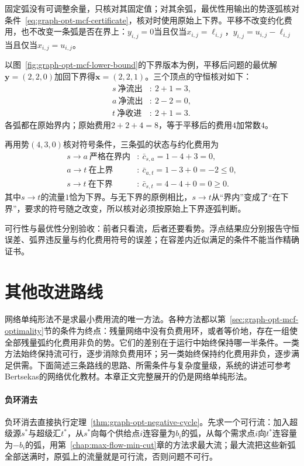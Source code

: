 固定弧没有可调整余量，只核对其固定值；对其余弧，最优性用输出的势逐弧核对条件~\eqref{eq:graph-opt-mcf-certificate}，核对时使用原始上下界。平移不改变约化费用，也不改变一条弧是否在界上：$y_{i,j}=0$当且仅当$x_{i,j}=\ell_{i,j}$，$y_{i,j}=u_{i,j}-\ell_{i,j}$当且仅当$x_{i,j}=u_{i,j}$。

以图~\ref{fig:graph-opt-mcf-lower-bound}的下界版本为例，平移后问题的最优解$\bm y=(2,2,0)$加回下界得$\bm x=(2,2,1)$。三个顶点的守恒核对如下：
\[
  \begin{aligned}
    s\ \text{净流出}&:\ 2+1=3,\\
    a\ \text{净流出}&:\ 2-2=0,\\
    t\ \text{净收进}&:\ 2+1=3.
  \end{aligned}
\]
各弧都在原始界内；原始费用$2+2+4=8$，等于平移后的费用$4$加常数$4$。

再用势$(4,3,0)$核对符号条件，三条弧的状态与约化费用为
\[
  \begin{aligned}
    s\to a\ \text{严格在界内}&:\ \bar c_{s,a}=1-4+3=0,\\
    a\to t\ \text{在上界}&:\ \bar c_{a,t}=1-3+0=-2\leq0,\\
    s\to t\ \text{在下界}&:\ \bar c_{s,t}=4-4+0=0\geq0.
  \end{aligned}
\]
其中$s\to t$的流量$1$恰为下界。与无下界的原例相比，$s\to t$从“界内”变成了“在下界”，要求的符号随之改变，所以核对必须按原始上下界逐弧判断。

可行性与最优性分别验收：前者只看流，后者还要看势。浮点结果应分别报告守恒误差、弧界违反量与约化费用符号的误差；在容差内近似满足的条件不能当作精确证书。

\section{其他改进路线}
\label{sec:graph-opt-mcf-other-methods}

网络单纯形法不是求最小费用流的唯一方法。各种方法都以第~\ref{sec:graph-opt-mcf-optimality}节的条件为终点：残量网络中没有负费用环，或者等价地，存在一组使全部残量弧约化费用非负的势。它们的差别在于运行中始终保持哪一半条件。一类方法始终保持流可行，逐步消除负费用环；另一类始终保持约化费用非负，逐步满足供需。下面简述三条路线的思路、所需条件与复杂度量级，系统的讲述可参考Bertsekas的网络优化教材。本章正文完整展开的仍是网络单纯形法。

\paragraph{负环消去}
负环消去直接执行定理~\ref{thm:graph-opt-negative-cycle}。先求一个可行流：加入超级源$s^\ast$与超级汇$t^\ast$，从$s^\ast$向每个供给点$i$连容量为$b_i$的弧，从每个需求点$i$向$t^\ast$连容量为$-b_i$的弧，用第~\ref{chap:max-flow-min-cut}章的方法求最大流；最大流把这些新弧全部送满时，原弧上的流量就是可行流，否则问题不可行。

